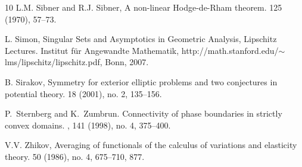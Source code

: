 \documentclass[10 pt,a4paper]{article}
\theoremstyle{definition}
\begin{document}
\begin{thebibliography}{10}
L.M. Sibner and R.J. Sibner, 
\newblock A non-linear Hodge-de-Rham theorem.
 125 (1970), 57--73.

L. Simon, 
\newblock Singular Sets and Asymptotics in Geometric Analysis, 
\newblock Lipschitz Lectures. Institut f\"ur Angewandte Mathematik, http://math.stanford.edu/$\sim$lms/lipschitz/lipschitz.pdf,
Bonn, 2007.

B. Sirakov, 
\newblock Symmetry for exterior elliptic problems and two conjectures in potential theory.
18 (2001), no. 2, 135--156.




P.~Sternberg and K.~Zumbrun.
\newblock Connectivity of phase boundaries in strictly convex domains. 
, 141 (1998), no. 4, 375--400.





V.V. Zhikov, 
\newblock Averaging of functionals of the calculus of variations and elasticity theory.
 50 (1986), no. 4, 675--710, 877.


\end{thebibliography}
%
%
\end{document}
